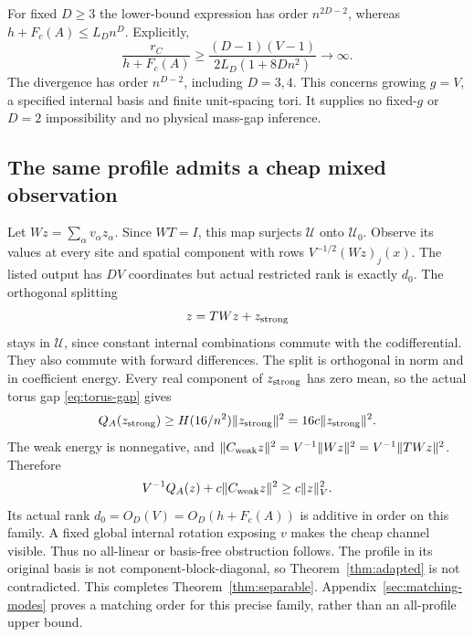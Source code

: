 For fixed $D\ge3$ the lower-bound expression has order $n^{2D-2}$,
whereas $h+F_c(A)\le L_Dn^D$. Explicitly,
\[
 \frac{r_C}{h+F_c(A)}\ge
 \frac{(D-1)(V-1)}{2L_D(1+8Dn^2)}\longrightarrow\infty.
\]
The divergence has order $n^{D-2}$, including $D=3,4$.
This concerns growing $g=V$, a specified internal basis and finite
unit-spacing tori. It supplies no fixed-$g$ or $D=2$ impossibility and
no physical mass-gap inference.

\subsection{The same profile admits a cheap mixed observation}
Let $Wz=\sum_\alpha v_\alpha z_\alpha$. Since $WT=I$, this map
surjects $\mathcal U$ onto $\mathcal U_0$. Observe its values at every
site and spatial component with rows $V^{-1/2}(Wz)_j(x)$.
The listed output has $DV$ coordinates but actual restricted rank is
exactly $d_0$.
The orthogonal splitting
\[
 z=TWz+z_{\rm strong}
\]
stays in $\mathcal U$, since constant internal combinations commute
with the codifferential. They also commute with forward differences.
The split is orthogonal in norm and in coefficient energy. Every real
component of $z_{\rm strong}$ has zero mean, so the actual torus gap
\eqref{eq:torus-gap} gives
\[
 Q_A(z_{\rm strong})\ge H(16/n^2)\|z_{\rm strong}\|^2
                         =16c\|z_{\rm strong}\|^2.
\]
The weak energy is nonnegative, and
$\|C_{\rm weak}z\|^2=V^{-1}\|Wz\|^2
=V^{-1}\|TWz\|^2$. Therefore
\[
 V^{-1}Q_A(z)+c\|C_{\rm weak}z\|^2\ge c\|z\|_{V}^2.
\]
Its actual rank $d_0=O_D(V)=O_D(h+F_c(A))$ is additive in order on this
family. A fixed global internal rotation exposing $v$ makes the cheap
channel visible. Thus no all-linear or basis-free obstruction follows.
The profile in its original basis is not component-block-diagonal, so
Theorem~\ref{thm:adapted} is not contradicted.
This completes Theorem~\ref{thm:separable}. Appendix~\ref{sec:matching-modes} proves a matching order for this precise family, rather than an all-profile upper bound.
